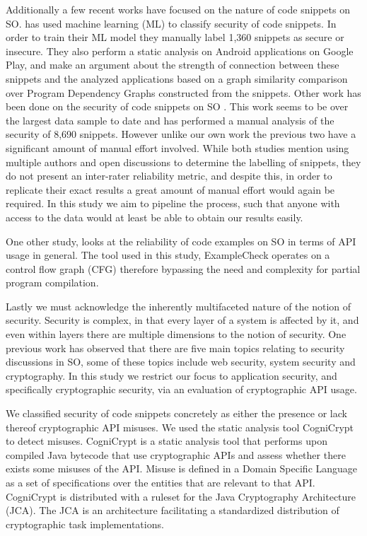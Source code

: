 \documentclass[10pt, conference]{IEEEtran}
\begin{document}
Additionally a few recent works have focused on the nature of code snippets on SO. \cite{7958574} has used machine learning (ML) to classify security of code snippets. In order to train their ML model they manually label 1,360 snippets as secure or insecure. They also perform a static analysis on Android applications on Google Play, and make an argument about the strength of connection between these snippets and the analyzed applications based on a graph similarity comparison over Program Dependency Graphs constructed from the snippets. Other work has been done on the security of code snippets on SO \cite{DBLP:journals/corr/abs-1901-01327}. This work seems to be over the largest data sample to date and has performed a manual analysis of the security of 8,690 snippets. However unlike our own work the previous two have a significant amount of manual effort involved. While both studies mention using multiple authors and open discussions to determine the labelling of snippets, they do not present an inter-rater reliability metric, and despite this, in order to replicate their exact results a great amount of manual effort would again be required. In this study we aim to pipeline the process, such that anyone with access to the data would at least be able to obtain our results easily.

One other study, \cite{Zhang:2018:CEO:3180155.3180260} looks at the reliability of code examples on SO in terms of API usage in general. The tool used in this study, ExampleCheck operates on a control flow graph (CFG) therefore bypassing the need and complexity for partial program compilation.
 
 
Lastly we must acknowledge the inherently multifaceted nature of the notion of security. Security is complex, in that every layer of a system is affected by it, and even within layers there are multiple dimensions to the notion of security. One previous work \cite{Yang2016} has observed that there are five main topics relating to security discussions in SO, some of these topics include web security, system security and cryptography. In this study we restrict our focus to application security, and specifically cryptographic security, via an evaluation of cryptographic API usage.

We classified security of code snippets concretely as either the presence or lack thereof cryptographic API misuses. We used the static analysis tool CogniCrypt \cite{krger_et_al:LIPIcs:2018:9215} to detect misuses. CogniCrypt is a static analysis tool that performs upon compiled Java bytecode that use cryptographic APIs and assess whether there exists some misuses of the API. Misuse is defined in a Domain Specific Language as a set of specifications over the entities that are relevant to that API. CogniCrypt is distributed with a ruleset for the Java Cryptography Architecture (JCA). The JCA is an architecture facilitating a standardized distribution of cryptographic task implementations.
\end{document}
